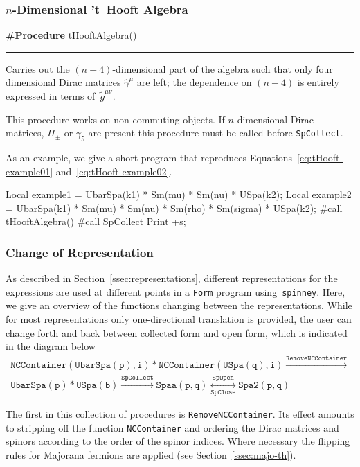 \documentclass[preprint,number,12pt,sort&compress]{elsarticle}
\newcommand{\FORM}{{\texttt{Form}}}
\newcommand{\spinney}{{\texttt{spinney}}}
\newlength{\funcindent}
\newlength{\funcwidth}
\newenvironment{Procedure}[2]{%
\hspace{.8\funcindent}\begin{boxedminipage}{\funcwidth}
	\raggedright \textbf{\#Procedure} #1(#2)

	\vspace{-1.5ex}

	\rule{\textwidth}{0.5\fboxrule}
	\setlength{\parskip}{2ex}
}{\end{boxedminipage}}
\begin{document}
\subsubsection{$n$-Dimensional 't~Hooft Algebra}

\begin{Procedure}{tHooftAlgebra}{}
   Carries out the $(n-4)$-dimensional part of the algebra such
   that only four dimensional Dirac matrices $\hat{\gamma}^\mu$ are
   left; the dependence on $(n-4)$ is entirely expressed in terms
	of~$\tilde{g}^{\mu\nu}$.
	
	This procedure works on non-commuting objects. If $n$-dimensional
	Dirac matrices, $\Pi_\pm$ or $\gamma_5$ are present this procedure
	must be called before \texttt{SpCollect}.
\end{Procedure}

\medskip
As an example, we give a short program that reproduces
Equations~\eqref{eq:tHooft-example01} and~\eqref{eq:tHooft-example02}.
\begin{spform}
Local example1 =
   UbarSpa(k1) * Sm(mu) * Sm(nu) * USpa(k2);
Local example2 =
   UbarSpa(k1) * Sm(mu) * Sm(nu) *
      Sm(rho) * Sm(sigma) * USpa(k2);
#call tHooftAlgebra()
#call SpCollect
Print +s;
\end{spform}

\subsubsection{Change of Representation}
\label{sec:ChangeRep}
As described in Section~\ref{ssec:representations},
different representations for the
expressions are used at different points in a \FORM{}
program using~\spinney{}. Here, we give an overview of
the functions changing between the representations.
While for most representations only one-directional translation is
provided, the user can change forth and back between collected form
and open form, which is indicated in the diagram below
\begin{multline}
\mathtt{NCContainer(UbarSpa(p),i)*NCContainer(USpa(q),i)}
\stackrel{\mathtt{RemoveNCContainer}}{\longrightarrow}\\
\mathtt{UbarSpa(p)*USpa(b)}
\stackrel{\mathtt{SpCollect}}{\longrightarrow}
\mathtt{Spaa(p,q)}
{\mathop{\longleftrightarrow}\limits_{\texttt{SpClose}}^{\texttt{SpOpen}}}
\mathtt{Spa2(p,q)}
\end{multline}

The first in this collection of procedures is \texttt{RemoveNCContainer}.
Its effect amounts to stripping off the function \texttt{NCContainer}
and ordering the Dirac matrices and spinors according to the
order of the spinor indices. Where necessary the flipping rules for
Majorana fermions are applied (see Section~\ref{ssec:majo-th}).
\end{document}
